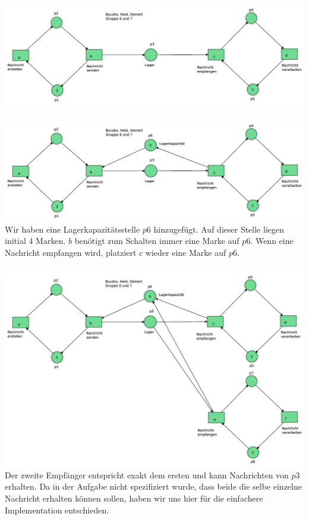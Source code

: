 \documentclass[a4paper,12pt]{scrartcl}
\begin{document}
\subsubsection{}
\includegraphics[scale=0.4]{6_4_1.png}

\subsubsection{}
\includegraphics[scale=0.4]{6_4_2.png}
\\
Wir haben eine Lagerkapazitätsstelle $p6$ hinzugefügt. 
Auf dieser Stelle liegen initial 4 Marken. $b$ benötigt zum Schalten 
immer eine Marke auf $p6$. Wenn eine Nachricht empfangen wird, 
platziert $c$ wieder eine Marke auf $p6$.

\subsubsection{}
\includegraphics[scale=0.4]{6_4_3.png}
\\
Der zweite Empfänger entspricht exakt dem ersten und kann Nachrichten von $p3$ erhalten. Da in der Aufgabe nicht spezifiziert wurde, dass beide die selbe einzelne Nachricht erhalten können sollen, haben wir uns hier für die einfachere Implementation entschieden. 
\end{document}
